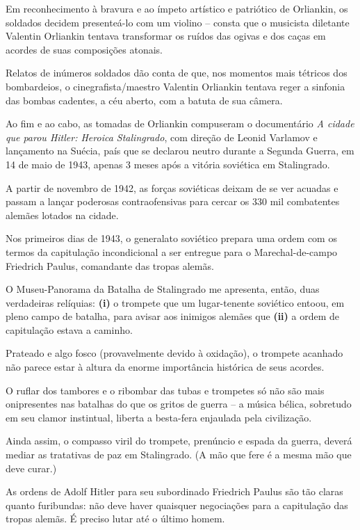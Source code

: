 Em reconhecimento à bravura e ao ímpeto artístico e patriótico de
Orliankin, os soldados decidem presenteá-lo com um violino -- consta que
o musicista diletante Valentin Orliankin tentava transformar os ruídos
das ogivas e dos caças em acordes de suas composições atonais.

Relatos de inúmeros soldados dão conta de que, nos momentos mais
tétricos dos bombardeios, o cinegrafista/maestro Valentin Orliankin
tentava reger a sinfonia das bombas cadentes, a céu aberto, com a batuta
de sua câmera.

Ao fim e ao cabo, as tomadas de Orliankin compuseram o documentário
\emph{A cidade que parou Hitler: Heroica Stalingrado}, com direção de
Leonid Varlamov e lançamento na Suécia, país que se declarou neutro
durante a Segunda Guerra, em 14 de maio de 1943, apenas 3 meses após a
vitória soviética em Stalingrado.

A partir de novembro de 1942, as forças soviéticas deixam de se ver
acuadas e passam a lançar poderosas contraofensivas para cercar os 330
mil combatentes alemães lotados na cidade.

Nos primeiros dias de 1943, o generalato soviético prepara uma ordem com
os termos da capitulação incondicional a ser entregue para o
Marechal-de-campo Friedrich Paulus, comandante das tropas alemãs.

O Museu-Panorama da Batalha de Stalingrado me apresenta, então, duas
verdadeiras relíquias: \textbf{(i)} o trompete que um lugar-tenente
soviético entoou, em pleno campo de batalha, para avisar aos inimigos
alemães que \textbf{(ii)} a ordem de capitulação estava a caminho.

Prateado e algo fosco (provavelmente devido à oxidação), o trompete
acanhado não parece estar à altura da enorme importância histórica de
seus acordes.

O ruflar dos tambores e o ribombar das tubas e trompetes só não são mais
onipresentes nas batalhas do que os gritos de guerra -- a música bélica,
sobretudo em seu clamor instintual, liberta a besta-fera enjaulada pela
civilização.

Ainda assim, o compasso viril do trompete, prenúncio e espada da guerra,
deverá mediar as tratativas de paz em Stalingrado. (A mão que fere é a
mesma mão que deve curar.)

As ordens de Adolf Hitler para seu subordinado Friedrich Paulus são tão
claras quanto furibundas: não deve haver quaisquer negociações para a
capitulação das tropas alemãs. É preciso lutar até o último homem.

